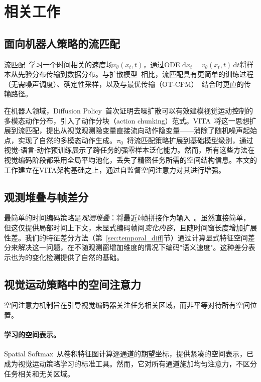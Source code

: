 \section{相关工作}
\label{sec:related_work}

\subsection{面向机器人策略的流匹配}

流匹配~\cite{lipman2023flow,liu2023flow}学习一个时间相关的速度场$v_\theta(x_t, t)$，通过ODE $\mathrm{d}x_t = v_\theta(x_t, t)\,\mathrm{d}t$将样本从先验分布传输到数据分布。与扩散模型~\cite{ho2020denoising,song2021score}相比，流匹配具有更简单的训练过程（无需噪声调度）、确定性采样，以及与最优传输（OT-CFM）~\cite{tong2024improving}结合时更直的传输路径。

在机器人领域，Diffusion Policy~\cite{chi2023diffusion}首次证明去噪扩散可以有效建模视觉运动控制的多模态动作分布，引入了动作分块（action chunking）范式。VITA~\cite{gao2026vita}将这一思想扩展到流匹配，提出从视觉观测隐变量直接流向动作隐变量——消除了随机噪声起始点，实现了自然的多模态动作生成。$\pi_0$~\cite{black2024pi0}将流匹配策略扩展到基础模型级别，通过视觉-语言-动作预训练展示了跨任务的强零样本泛化能力。然而，所有这些方法在视觉编码阶段都采用全局平均池化，丢失了精密任务所需的空间结构信息。本文的工作建立在VITA架构基础之上，通过自监督空间注意力对其进行增强。

\subsection{观测堆叠与帧差分}

最简单的时间编码策略是\emph{观测堆叠}：将最近$k$帧拼接作为输入~\cite{mnih2015human}。虽然直接简单，但这仅提供局部时间上下文，未显式编码帧间\emph{变化内容}，且随时间窗长度增加扩展性差。我们的特征差分方法（第~\ref{sec:temporal_diff}节）通过计算显式特征空间差分来解决这一问题，在不随观测窗增加维度的情况下编码"语义速度"。这种差分表示也为\fasa{}的变化检测提供了自然的基础。

\subsection{视觉运动策略中的空间注意力}

空间注意力机制旨在引导视觉编码器关注任务相关区域，而非平等对待所有空间位置。

\paragraph{学习的空间表示。}Spatial Softmax~\cite{levine2016end}从卷积特征图计算逐通道的期望坐标，提供紧凑的空间表示，已成为视觉运动策略学习的标准工具。然而，它对所有通道施加均匀注意力，不区分任务相关和无关区域。

